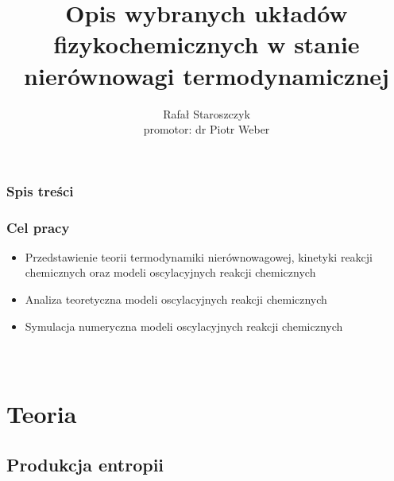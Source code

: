 \documentclass{beamer}
\title{Opis wybranych układów fizykochemicznych w stanie nierównowagi termodynamicznej}
\author{Rafał Staroszczyk\\\footnotesize promotor: dr Piotr Weber}
\institute{Politechnika Gdańska}
\date{}
\begin{document}
\beamertemplatenavigationsymbolsempty
{}

\begin{frame}
\titlepage
\end{frame}

\begin{frame}
\frametitle{Spis treści}
\tableofcontents
\end{frame}

\begin{frame}
\frametitle{Cel pracy}
\begin{itemize}
\item Przedstawienie teorii termodynamiki nierównowagowej, kinetyki reakcji chemicznych oraz modeli oscylacyjnych reakcji chemicznych
\item Analiza teoretyczna modeli oscylacyjnych reakcji chemicznych
\item Symulacja numeryczna modeli oscylacyjnych reakcji chemicznych
\end{itemize}
\end{frame}

\begin{frame}
\begin{columns}

\begin{figure}
\end{figure}
\end{columns}
\end{frame}

\section{Teoria}
\subsection{Produkcja entropii}
\end{document}
